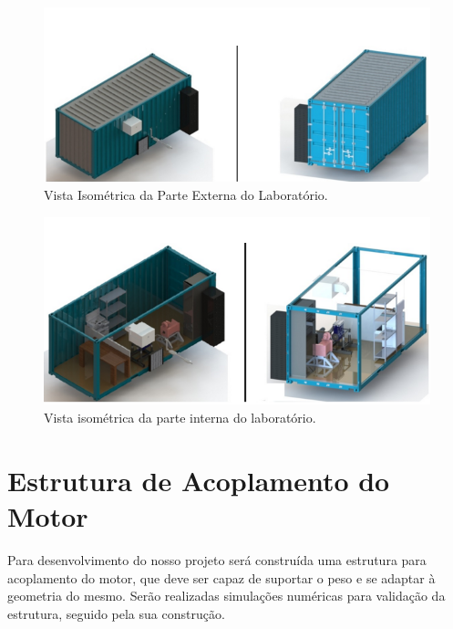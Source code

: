 \begin{figure}[h!]
	\centering
	\includegraphics[keepaspectratio=true,scale= 0.35]{figuras/vistaisometricalaboratorio.png}
	\caption{Vista Isométrica da Parte Externa do Laboratório.}
	\label{fig:isometricalaboratorio}
\end{figure}
	
\begin{figure}[h!]
	\centering
	\includegraphics[keepaspectratio=true,scale= 0.4]{figuras/isometricainterna.png}
	\caption{Vista isométrica da parte interna do laboratório.}
	\label{fig:isometricainterna}
\end{figure}

\section{Estrutura de Acoplamento do Motor}

	Para desenvolvimento do nosso projeto será construída uma estrutura para acoplamento do motor, que deve ser capaz de suportar o peso e se adaptar à geometria do mesmo. Serão realizadas simulações numéricas para validação da estrutura, seguido pela sua construção.
	
